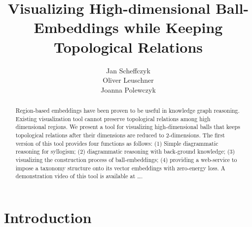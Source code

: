 \documentclass[]{article}
\title{Visualizing High-dimensional Ball-Embeddings
	while Keeping Topological Relations}
\author{Jan Scheffczyk \\ Oliver Leuschner \\ Joanna Polewczyk}
\begin{document}
\maketitle

\begin{abstract}
	Region-based embeddings have been proven to be useful in knowledge graph reasoning. Existing visualization tool cannot preserve topological relations among high dimensional regions. We present a tool for visualizing high-dimensional balls that keeps topological relations after their dimensions are reduced to 2-dimensions. The first version of this tool provides four functions as follows: (1) Simple diagrammatic reasoning for syllogism; (2) diagrammatic reasoning with back-ground knowledge; (3) visualizing the construction process of ball-embeddings; (4) providing a web-service to impose a taxonomy structure onto its vector embeddings with zero-energy loss. A demonstration video of this tool is available at \dots. 
	
\end{abstract}
%
%
%
\newpage
\section{Introduction}

\end{document}
